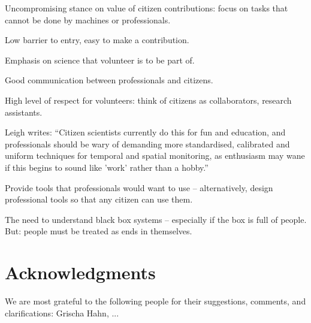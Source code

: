 \documentclass{ar2e}
\begin{document}
Uncompromising stance on value of citizen contributions: focus on tasks that
cannot be done by machines or professionals.

Low barrier to entry, easy to make a contribution.

Emphasis on science that volunteer is to be part of. 

Good communication between professionals and citizens.

High level of respect for volunteers: think of citizens as collaborators,
research assistants.

Leigh writes: ``Citizen
scientists currently do this for fun and education, and professionals should
be wary of demanding more standardised, calibrated and uniform techniques for
temporal and spatial monitoring, as enthusiasm may wane if this begins to
sound like 'work' rather than a hobby.''

Provide tools that professionals would want to use -- alternatively, design
professional tools so that any citizen can use them.

The need to understand black box systems -- especially if the box is full of
people. But: people must be treated as ends in themselves. 




\section*{Acknowledgments}

We are most grateful to the following people for their suggestions, 
comments, and clarifications: Grischa Hahn, ... 
\end{document}
